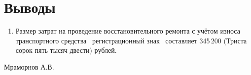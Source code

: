 \section{Выводы}
%
%
\begin{enumerate}
\item  Размер затрат на проведение восстановительного ремонта с учётом износа  
транспортного средства  \, регистрационный знак  \, составляет 345\,200 (Триста сорок пять тысяч двести) рублей.\\[-2mm]   
\end{enumerate}
\vspace{10mm}
      \hfill                        {Мраморнов А.В.}
\vspace{7mm}
\relax

